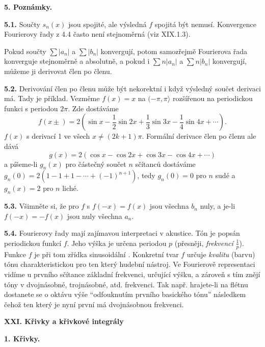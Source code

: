 \documentclass[12pt]{article}
\newcommand{\boldgreek}[1]{\mbox{\boldmath$#1$}}
\begin{document}
\vskip10mm

 {\large\bf 5. Poznámky.}

\bigskip

{\bf 5.1.} Součty $s_n(x)$ jsou spojité, ale výsledná 
$f$ spojitá být nemusí. Konvergence Fourierovy řady z 4.4 často není stejnoměrná
(viz XIX.1.3). 

Pokud součty $\sum |a_n|$ a $\sum |b_n|$ konvergují, potom samozřejmě Fourierova řada  konverguje stejnoměrně a absolutně, a pokud i  $\sum n|a_n|$ a $\sum n|b_n|$ konvergují, můžeme ji derivovat člen po členu.

\bigskip

{\bf 5.2.} Derivování člen po členu může být nekorektní i když výsledný součet derivaci má. Tady je příklad. Vezměme $f(x)=x$ na $(-\pi,\pi\rangle$ rozšířenou na periodickou funkci s periodou $2\pi$. Zde dostáváme
$$
f(x\pm)=2(\sin x-\frac12\sin 2x+\frac13\sin3x-\frac14\sin 4x+\cdots).
$$
$f(x)$ s derivací 1 ve všech $x\neq(2k+1)\pi$. Formální derivace člen po členu
ale dává
$$
g(x)=2(\cos x-\cos 2x+\cos3x-\cos 4x+\cdots)
$$
a píšeme-li $g_n(x)$ pro částečný součet $n$ sčítanců dostáváme $g_n(0)=
2(1-1+1-\cdots+(-1)^{n+1})$, tedy $g_n(0)=0$ pro $n$ sudé a $g_n(x)=2$ pro $n$ liché.

\bigskip

{\bf 5.3.} Všimněte si, že pro $f$ s $f(-x)=f(x)$ jsou všechna $b_n$ nuly, a je-li $f(-x)=-f(x)$ jsou nuly všechna $a_n$.

\bigskip

{\bf 5.4.} Fourierovy řady mají zajímavou interpretaci v akustice. Tón je popsán  periodickou funkcí $f$. Jeho výška je určena periodou $p$ (přesněji,  {\em frekvencí} $\frac1p$). Funkce $f$ je při tom zřídka sinusoidální .
Konkretní tvar $f$ určuje {\em kvalitu} (barvu) tónu charakteristickou pro ten který hudební nástroj. Ve Fourierově representaci vidíme u prvního sčítance
 základní frekvenci, určující výšku, a zároveň s tím znějí tóny v dvojnásobné, trojnásobné, atd. frekvenci.  
Tak např. hrajete-li na flétnu dostanete se o oktávu výše  ``odfouknutím prvního basického tónu'' následkem čehož ten který je nyní první má dvojnásobnou frekvenci.


\newpage


 \def\ver#1{\text{\boldgreek#1}}
 
 \centerline{\Large\bf XXI. Křivky a křivkové integrály} 
 
 \vskip10mm
 
  
 {\large\bf 1.  Křivky.}
 
\end{document}
